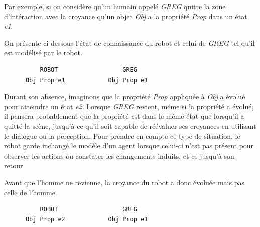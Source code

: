 \documentclass[a4paper,11pt,twoside]{StyleThese}
\begin{document}

Par exemple, si on considère qu'un humain appelé \textit{GREG} quitte la zone d'intéraction avec la croyance qu'un objet \textit{Obj} a la propriété \textit{Prop} dans un état \textit{e1}. 

On présente ci-dessous l'état de connaissance du robot et celui de \textit{GREG} tel qu'il est modélisé par le robot.

\begin{scriptsize}
\begin{verbatim}
          ROBOT                  GREG
      Obj Prop e1            Obj Prop e1
\end{verbatim}
\end{scriptsize}

Durant son absence, imaginons que la propriété \textit{Prop} appliquée à \textit{Obj} a évolué pour atteindre un état \textit{e2}.
Lorsque \textit{GREG} revient, même si la propriété a évolué, il pensera probablement que la propriété est dans le même état que lorsqu'il a quitté la scène, jusqu'à ce qu'il soit capable de réévaluer ses croyances en utilisant le dialogue ou la perception. Pour prendre en compte ce type de situation, le robot garde inchangé le modèle d'un agent lorsque celui-ci n'est pas présent pour observer les actions ou constater les changements induits, et ce jusqu'à son retour.

Avant que l'homme ne revienne, la croyance du robot a donc évoluée mais pas celle de l'homme.

\begin{scriptsize}
\begin{verbatim}
          ROBOT                  GREG
      Obj Prop e2            Obj Prop e1
\end{verbatim}
\end{scriptsize}
\end{document}
